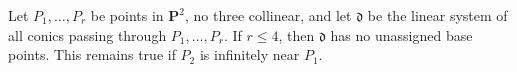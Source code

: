 Let $P_1, \ldots, P_r$ be points in $\mathbf{P}^2$, no three collinear, and let $\mathfrak{d}$ be the linear system of all conics passing through $P_1, \ldots, P_r$. If $r \leqslant 4$, then $\mathfrak{d}$ has no unassigned base points. This remains true if $P_2$ is infinitely near $P_1$.
